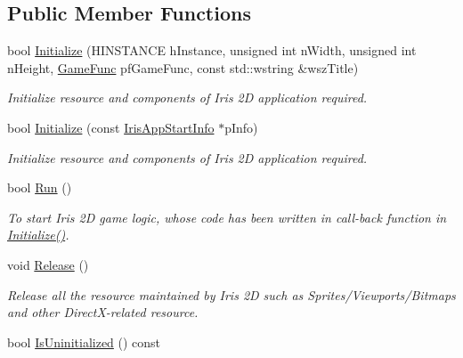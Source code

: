 \subsection*{Public Member Functions}
\begin{DoxyCompactItemize}
\item 
bool \hyperlink{class_iris2_d_1_1_iris_application_a84f3ddebb3a3ffb0c172bd41fb952e1a}{Initialize} (H\+I\+N\+S\+T\+A\+N\+CE h\+Instance, unsigned int n\+Width, unsigned int n\+Height, \hyperlink{class_iris2_d_1_1_iris_application_ac74720e6cd3a1968f73e92ea99675884}{Game\+Func} pf\+Game\+Func, const std\+::wstring \&wsz\+Title)
\begin{DoxyCompactList}\small\item\em Initialize resource and components of Iris 2D application required. \end{DoxyCompactList}\item 
bool \hyperlink{class_iris2_d_1_1_iris_application_ac20656815694f980fccfc4369727a9a9}{Initialize} (const \hyperlink{struct_iris2_d_1_1_iris_application_1_1_iris_app_start_info}{Iris\+App\+Start\+Info} $\ast$p\+Info)
\begin{DoxyCompactList}\small\item\em Initialize resource and components of Iris 2D application required. \end{DoxyCompactList}\item 
bool \hyperlink{class_iris2_d_1_1_iris_application_ae6bb59365978c945201fd8cf82105e4f}{Run} ()
\begin{DoxyCompactList}\small\item\em To start Iris 2D game logic, whose code has been written in call-\/back function in \hyperlink{class_iris2_d_1_1_iris_application_a84f3ddebb3a3ffb0c172bd41fb952e1a}{Initialize()}. \end{DoxyCompactList}\item 
\mbox{\label{class_iris2_d_1_1_iris_application_a486d999a8d9e96f21b9d064d10d15b96}} 
void \hyperlink{class_iris2_d_1_1_iris_application_a486d999a8d9e96f21b9d064d10d15b96}{Release} ()
\begin{DoxyCompactList}\small\item\em Release all the resource maintained by Iris 2D such as Sprites/\+Viewports/\+Bitmaps and other Direct\+X-\/related resource. \end{DoxyCompactList}\item 
bool \hyperlink{class_iris2_d_1_1_iris_application_a1035e03a186b934ecf57371e42475eea}{Is\+Uninitialized} () const

\end{DoxyCompactItemize}

